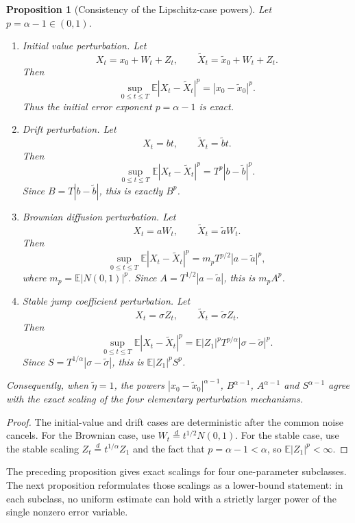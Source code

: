 \documentclass[10pt,a4paper]{amsart}
\newtheorem{proposition}[theorem]{Proposition}
\newcommand{\E}{\mathbb{E}}
\newcommand{\1}{\mathbf{1}}
\newcommand{\wt}{\tilde}
\begin{document}
\begin{proposition}[Consistency of the Lipschitz-case powers]
\label{prop:constant-consistency}
Let $p=\alpha-1\in(0,1)$.
\begin{enumerate}[label=\textup{(\roman*)}]
\item \textup{Initial value perturbation.} Let
\[
  X_t=x_0+W_t+Z_t,
  \qquad
  \wt X_t=\wt x_0+W_t+Z_t.
\]
Then
\[
  \sup_{0\le t\le T}\E|X_t-\wt X_t|^p=|x_0-\wt x_0|^p.
\]
Thus the initial error exponent $p=\alpha-1$ is exact.

\item \textup{Drift perturbation.} Let
\[
  X_t=bt,
  \qquad
  \wt X_t=\wt b t.
\]
Then
\[
  \sup_{0\le t\le T}\E|X_t-\wt X_t|^p=T^p|b-\wt b|^p.
\]
Since $B=T|b-\wt b|$, this is exactly $B^p$.

\item \textup{Brownian diffusion perturbation.} Let
\[
  X_t=aW_t,
  \qquad
  \wt X_t=\wt a W_t.
\]
Then
\[
  \sup_{0\le t\le T}\E|X_t-\wt X_t|^p
  =m_p T^{p/2}|a-\wt a|^p,
\]
where $m_p=\E|N(0,1)|^p$. Since $A=T^{1/2}|a-\wt a|$, this is $m_p A^p$.

\item \textup{Stable jump coefficient perturbation.} Let
\[
  X_t=\sigma Z_t,
  \qquad
  \wt X_t=\wt\sigma Z_t.
\]
Then
\[
  \sup_{0\le t\le T}\E|X_t-\wt X_t|^p
  =\E|Z_1|^p T^{p/\alpha}|\sigma-\wt\sigma|^p.
\]
Since $S=T^{1/\alpha}|\sigma-\wt\sigma|$, this is $\E|Z_1|^pS^p$.
\end{enumerate}
Consequently, when $\wt\eta=1$, the powers $|x_0-\wt x_0|^{\alpha-1}$, $B^{\alpha-1}$, $A^{\alpha-1}$ and $S^{\alpha-1}$ agree with the exact scaling of the four elementary perturbation mechanisms.
\end{proposition}

\begin{proof}
The initial-value and drift cases are deterministic after the common noise cancels. For the Brownian case, use $W_t\stackrel{d}{=}t^{1/2}N(0,1)$. For the stable case, use the stable scaling $Z_t\stackrel{d}{=}t^{1/\alpha}Z_1$ and the fact that $p=\alpha-1<\alpha$, so $\E|Z_1|^p<\infty$.
\end{proof}

The preceding proposition gives exact scalings for four one-parameter subclasses. The next proposition reformulates those scalings as a lower-bound statement: in each subclass, no uniform estimate can hold with a strictly larger power of the single nonzero error variable.
\end{document}
